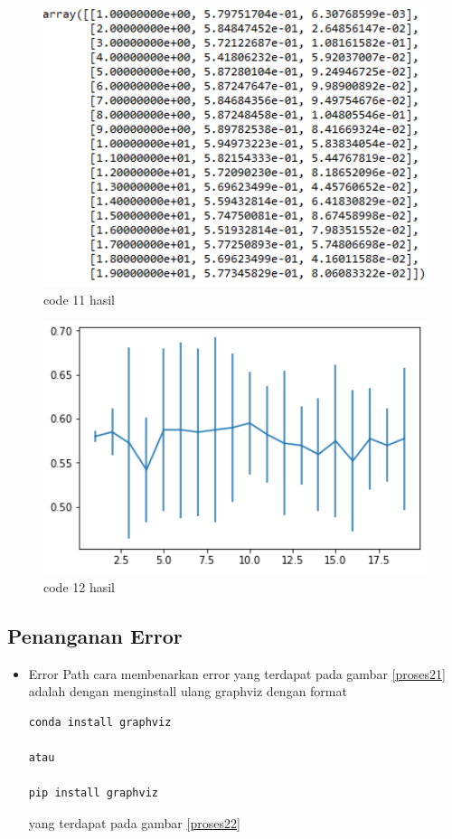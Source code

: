 \begin{itemize}
\begin{figure}
\centerline{\includegraphics[width=1\textwidth]{figures/fathi/chapter3/11.PNG}}
\caption{code 11 hasil}
\label{proses11}
\end{figure}

\begin{figure}
\centerline{\includegraphics[width=1\textwidth]{figures/fathi/chapter3/12.PNG}}
\caption{code 12 hasil}
\label{proses12}
\end{figure}

\end{itemize}

\subsection {Penanganan Error}
\begin{itemize}
\item Error Path
\subitem
cara membenarkan error yang terdapat pada gambar \ref{proses21} adalah dengan menginstall ulang graphviz dengan format 
\begin{verbatim}
conda install graphviz

atau

pip install graphviz
\end{verbatim}
yang terdapat pada gambar \ref{proses22}
\end{itemize}

